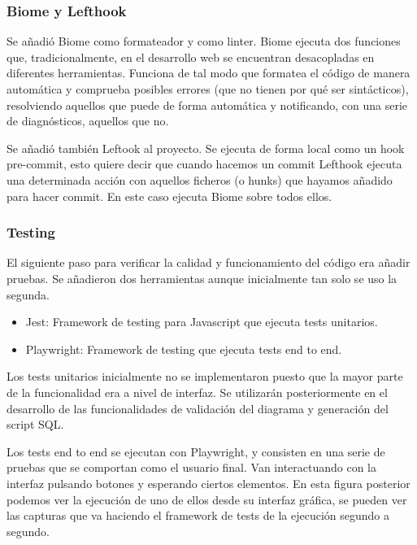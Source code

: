 \subsubsection{Biome y Lefthook}
Se añadió Biome como formateador y como linter. Biome ejecuta dos funciones que, tradicionalmente, en el desarrollo web se encuentran desacopladas en diferentes herramientas. Funciona de tal modo que formatea el código de manera automática y comprueba posibles errores (que no tienen por qué ser sintácticos), resolviendo aquellos que puede de forma automática y notificando, con una serie de diagnósticos, aquellos que no.


Se añadió también Leftook al proyecto. Se ejecuta de forma local como un hook pre-commit, esto quiere decir que cuando hacemos un commit Lefthook ejecuta una determinada acción con aquellos ficheros (o hunks) que hayamos añadido para hacer commit. En este caso ejecuta Biome sobre todos ellos.


\subsubsection{Testing}
El siguiente paso para verificar la calidad y funcionamiento del código era añadir pruebas. Se añadieron dos herramientas aunque inicialmente tan solo se uso la segunda.

\begin{itemize}\tightlist
    \item Jest: Framework de testing para Javascript que ejecuta tests unitarios.
    \item Playwright: Framework de testing que ejecuta tests end to end.
\end{itemize}

Los tests unitarios inicialmente no se implementaron puesto que la mayor parte de la funcionalidad era a nivel de interfaz. Se utilizarán posteriormente en el desarrollo de las funcionalidades de validación del diagrama y generación del script SQL.


Los tests end to end se ejecutan con Playwright, y consisten en una serie de pruebas que se comportan como el usuario final. Van interactuando con la interfaz pulsando botones y esperando ciertos elementos.
En esta figura posterior podemos ver la ejecución de uno de ellos desde su interfaz gráfica, se pueden ver las capturas que va haciendo el framework de tests de la ejecución segundo a segundo.

